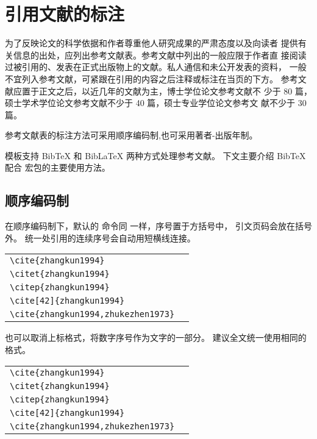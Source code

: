 
\chapter{引用文献的标注}
为了反映论文的科学依据和作者尊重他人研究成果的严肃态度以及向读者
提供有关信息的出处，应列出参考文献表。参考文献中列出的一般应限于作者直
接阅读过被引用的、发表在正式出版物上的文献。私人通信和未公开发表的资料，
一般不宜列入参考文献，可紧跟在引用的内容之后注释或标注在当页的下方。
参考文献应置于正文之后，以近几年的文献为主，博士学位论文参考文献不
少于 80 篇，硕士学术学位论文参考文献不少于 40 篇，硕士专业学位论文参考文
献不少于 30 篇。

参考文献表的标注方法可采用顺序编码制,也可采用著者-出版年制。

模板支持 BibTeX 和 BibLaTeX 两种方式处理参考文献。
下文主要介绍 BibTeX 配合  宏包的主要使用方法。


\section{顺序编码制}

在顺序编码制下，默认的  命令同  一样，序号置于方括号中，
引文页码会放在括号外。
统一处引用的连续序号会自动用短横线连接。

\begin{tabular}{l@{\quad$\Rightarrow$\quad}l}
  \verb|\cite{zhangkun1994}|               & \cite{zhangkun1994}               \\
  \verb|\citet{zhangkun1994}|              & \citet{zhangkun1994}              \\
  \verb|\citep{zhangkun1994}|              & \citep{zhangkun1994}              \\
  \verb|\cite[42]{zhangkun1994}|           & \cite[42]{zhangkun1994}           \\
  \verb|\cite{zhangkun1994,zhukezhen1973}| & \cite{zhangkun1994,zhukezhen1973} \\
\end{tabular}


也可以取消上标格式，将数字序号作为文字的一部分。
建议全文统一使用相同的格式。

\begin{tabular}{l@{\quad$\Rightarrow$\quad}l}
  \verb|\cite{zhangkun1994}|               & \cite{zhangkun1994}               \\
  \verb|\citet{zhangkun1994}|              & \citet{zhangkun1994}              \\
  \verb|\citep{zhangkun1994}|              & \citep{zhangkun1994}              \\
  \verb|\cite[42]{zhangkun1994}|           & \cite[42]{zhangkun1994}           \\
  \verb|\cite{zhangkun1994,zhukezhen1973}| & \cite{zhangkun1994,zhukezhen1973} \\
\end{tabular}



